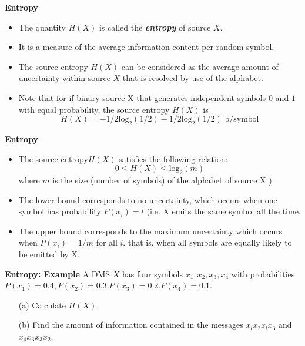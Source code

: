 \documentclass[]{article}
\begin{document}
\noindent \textbf{Entropy}
\begin{itemize}
\item The quantity $H(X)$ is called the \emph{\textbf{entropy}} of source $X$. \item It is a measure of the average information content per random symbol.
\item The source entropy $H(X)$ can be considered as the average amount of uncertainty
within source $X$ that is resolved by use of the alphabet.

\item Note that for if  binary source X that generates independent symbols $0$ and $1$ with equal probability, the source entropy $H(X)$ is
\[ H(X ) = -1/2 \mbox{log}_2 (1/2) - 1/2 \mbox{log}_2 (1/2) \mbox{   b/symbol}  \]
\end{itemize}




\noindent \textbf{Entropy}
\begin{itemize}
\item The source entropy$ H(X)$ satisfies the following relation:
\[0 \leq H(X) \leq \mbox{log}_2(m) \]where $m$ is the size (number of symbols) of the alphabet of source X ).
\item  The lower bound corresponds to no uncertainty, which occurs when one symbol has probability $P(x_i) = l$ (i.e. X emits the same symbol all the time.
\item The upper bound corresponds to the maximum uncertainty which occurs when $P(x_i) = 1 /m$ for all $i$. that is, when all symbols are equally likely to be emitted by X.
 \end{itemize}




\noindent \textbf{Entropy: Example}
A DMS $X$ has four symbols $x_1 , x_2, x_3, x_4$ with probabilities $P(x_1) = 0.4, P(x_2) = 0.3. P(x_3) = 0.2.
P(x_4) = 0.1$.
\begin{itemize}
\item[(a)] Calculate $H(X)$.
\item[(b)] Find the amount of information contained in the messages $x_lx_2x_lx_3$ and $x_4x_3x_3x_2$.
\end{itemize}
\end{document}
